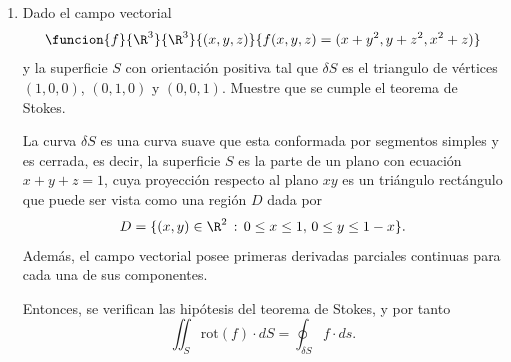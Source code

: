 \documentclass[a4,11pt]{aleph-examen}
\begin{document}
\begin{preguntas}
\begin{respuesta}
\begin{respuesta}
\begin{respuesta}
\begin{enumerate}
\begin{respuesta}
		Por el Teorema de Stokes se tiene que
		\[
		\int_C f\cdot dr=\iint_S \rot(f) \cdot dS
		\]
		donde $S$ es la elipse formada por la intersección de las ecuaciones $x+y+z=1$ y $x^2+y^2=9$. Por definición se tiene que
		\[
		\rot f(x,y,z)=(0-0,x^2-0,y^2-0)=(0,x^2,y^2)
		\]
		para todo $x,y,z\in\R$. Por otra parte, sea
		\[
		\funcion{\alpha}{D}{\R^3}{(u,v)}{(u,v,1-u-v)}
		\]
		donde $D$ es el círculo centrado en el origen de radio 3 y además
		\[
		N(u,v)=(1,0,-1)\times(0,1,-1)=(1,1,1)
		\]
		para cada $(u,v)\in D$. Por todo esto se tiene que
			\begin{align*}
				\int_C f\cdot dr
				&=\iint_S \rot(f) \cdot dS\\
				&=\iint_D \rot(f)(\alpha(u,v)) \cdot N(u,v)\ dA\\
				&=\iint_D \rot(f)(u,v,1-u-v) \cdot (1,1,1)\ dA\\
				&=\iint_D (0,u^2,v^2) \cdot (1,1,1)\ dA\\
				&=\iint_D u^2+v^2\ dudv\\
				&=\int_0^{2\pi} \int_0^3 r^3\ drd\theta\\
				&=\dfrac{81\pi}{2}.
			\end{align*}
		Por lo tanto,
		\[
		\int_C f\cdot dr=\dfrac{81\pi}{2}.\qedhere
		\]
\end{respuesta}


\item Dado el campo vectorial
    \[
    \funcion{f}{\R^3}{\R^3}
    {(x,y,z)}{f(x,y,z)=(x+y^2,y+z^2,x^2+z)}
	\]
    y la superficie $S$ con orientación positiva tal que $\delta S$ es el triangulo de vértices $(1,0,0)$, $(0,1,0)$ y $(0,0,1)$. Muestre que se cumple el teorema de Stokes.
    
\begin{respuesta}
    La curva $\delta S$ es una curva suave que esta conformada por segmentos simples y es cerrada, es decir, la superficie $S$ es la parte de un plano con ecuación $x+y+z=1$, cuya proyección respecto al plano $xy$ es un triángulo rectángulo que puede ser vista como una región $D$ dada por
    \[
    D=\{(x,y)\in\R^2\,:\,0\leq x \leq 1, \, 0 \leq y \leq 1 - x\}.
    \]
    Además, el campo vectorial posee primeras derivadas parciales continuas para cada una de sus componentes.
    
    \noindent Entonces, se verifican las hipótesis del teorema de Stokes, y por tanto
    \[
    \iint_{S}{\mbox{rot}(f)\cdot dS} = \oint_{\delta S}{f\cdot ds}.
    \]
    

\end{respuesta}
\end{enumerate}
\end{respuesta}
\end{respuesta}
\end{respuesta}
\end{preguntas}
\end{document}
